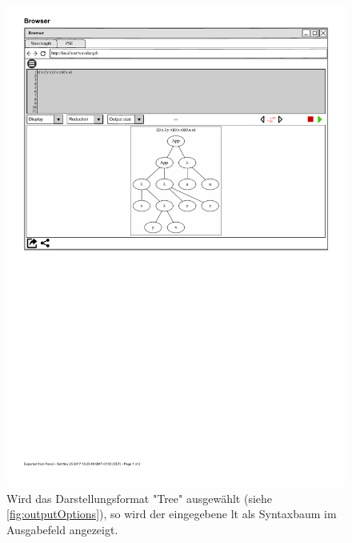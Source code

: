 \documentclass[parskip=full,11pt,twoside]{scrartcl}
\begin{document}
\begin{figure}[H]
	\centering
	\includegraphics[width=\textwidth]{img/displayTree1}
	\caption{\label{fig:tree}Wird das Darstellungsformat "Tree" ausgewählt (siehe \cref{fig:outputOptions}), so wird der eingegebene \gls{lt} als Syntaxbaum im Ausgabefeld angezeigt.}
\end{figure}
\end{document}
